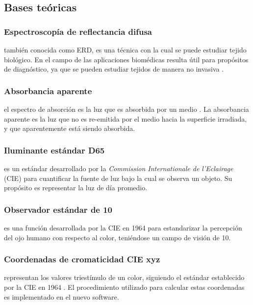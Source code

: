 \documentclass[conference]{IEEEtran}
\begin{document}
	\subsection{Bases te\'{o}ricas}
	
		\subsubsection{Espectroscop\'{i}a de reflectancia difusa}
		tambi\'{e}n conocida como ERD, es una t\'{e}cnica con la cual se puede estudiar tejido biol\'{o}gico. En el campo de las aplicaciones biom\'{e}dicas resulta \'{u}til para prop\'{o}sitos de diagn\'{o}stico, ya que se pueden estudiar tejidos de manera no invasiva \cite{Perez}.
		
		\subsubsection{Absorbancia aparente}
		
		el espectro de absorci\'{o}n es la luz que es absorbida por un medio \cite{Random}. La absorbancia aparente es la luz que no es re-emitida por el medio hacia la superficie irradiada, y que aparentemente est\'{a} siendo absorbida.
		
		\subsubsection{Iluminante est\'{a}ndar D65}
		
		es un est\'{a}ndar desarrollado por la \textit{Commission Internationale de l'Eclairage} (CIE) \cite{CIE} para cuantificar la fuente de luz bajo la cual se observa un objeto. Su prop\'{o}sito es representar la luz de d\'{i}a promedio.
		
		\subsubsection{Observador est\'{a}ndar de 10\degree}
		
		es una funci\'{o}n desarrollada por la CIE \cite{CIE} en 1964 para estandarizar la percepci\'{o}n del ojo humano con respecto al color, teni\'{e}ndose un campo de visi\'{o}n de 10\degree.		
	
		\subsubsection{Coordenadas de cromaticidad CIE xyz}
		representan los valores triest\'{i}mulo de un color, siguiendo el est\'{a}ndar establecido por la CIE en 1964 \cite{CIE}. El procedimiento utilizado para calcular estas coordenadas \cite{Schanda} es implementado en el nuevo software.
\end{document}
